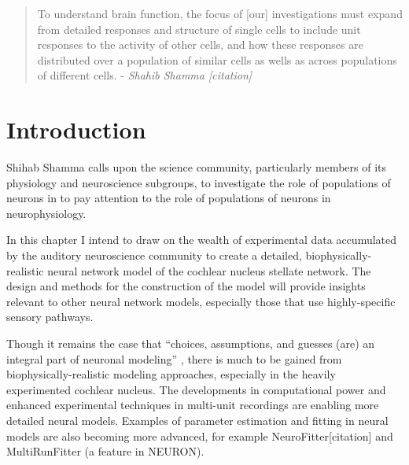  

\begin{quotation}
  To understand brain function, the focus of [our] investigations must
  expand from detailed responses and structure of single cells to
  include unit responses to the activity of other cells, and how these
  responses are distributed over a population of similar cells as
  wells as across populations of different cells.  - \emph{Shahib Shamma [citation]}
\citet{Shamma:1998}
\end{quotation}




\section{Introduction}

Shihab Shamma calls upon the science community, particularly members
of its physiology and neuroscience subgroups, to investigate the role
of populations of neurons in to pay attention to the role of
populations of neurons in neurophysiology.

In this chapter I intend to draw on the wealth of experimental data
accumulated by the auditory neuroscience community to create a
detailed, biophysically-realistic neural network model of the cochlear
nucleus stellate network.  The design and methods for the construction
of the model will provide insights relevant to other neural network
models, especially those that use highly-specific sensory pathways.

Though it remains the case that ``choices, assumptions, and guesses
(are) an integral part of neuronal modeling''
\citep{SegevBurkeEtAl:1998}, there is much to be gained from
biophysically-realistic modeling approaches, especially in the heavily
experimented cochlear nucleus. The developments in computational power
and enhanced experimental techniques in multi-unit recordings are
enabling more detailed neural models. Examples of parameter estimation
and fitting in neural models are also becoming more advanced, for
example NeuroFitter[citation] and MultiRunFitter (a feature in
NEURON).  

\medskip{}

